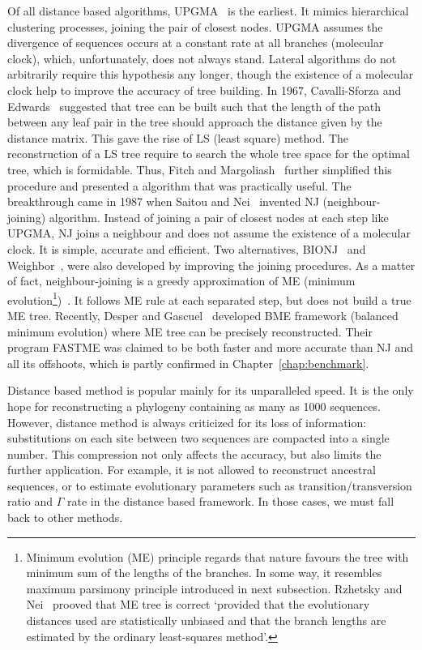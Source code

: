 Of all distance based algorithms, UPGMA~\cite{sokal58} is the earliest. It
mimics hierarchical clustering processes, joining the pair of closest nodes. UPGMA assumes
the divergence of sequences occurs at a constant rate at all branches (molecular clock), which, unfortunately,
does not always stand. Lateral algorithms do not arbitrarily require this hypothesis any longer,
though the existence of a molecular clock help to improve the accuracy of tree building.
In 1967, Cavalli-Sforza and Edwards~\cite{cavalliSforza67}
suggested that tree can be built such that the length of the path between any leaf pair in the tree
should approach the distance given by the distance matrix. This gave the rise
of LS (least square) method. The reconstruction of a LS tree
require to search the whole tree space for the optimal tree, which is formidable.
Thus, Fitch and Margoliash~\cite{fitch67}
further simplified this procedure and presented a algorithm that was practically useful.
The breakthrough came in 1987 when Saitou and Nei~\cite{saitou87} invented NJ (neighbour-joining)
algorithm. Instead of joining a pair of closest nodes at each step like UPGMA, NJ joins a neighbour and
does not assume the existence of a molecular clock.
It is simple, accurate and efficient. Two alternatives, BIONJ~\cite{gascuel97} and
Weighbor~\cite{bruno00}, were also developed by improving the joining procedures.
As a matter of fact, neighbour-joining is a greedy approximation of ME (minimum
evolution\footnote{Minimum evolution (ME) principle regards that nature favours the tree with minimum
sum of the lengths of the branches. In some way, it resembles maximum parsimony principle
introduced in next subsection. Rzhetsky and Nei~\cite{rzhetsky93}
prooved that ME tree is correct `provided that the evolutionary distances used are statistically
unbiased and that the branch lengths are estimated by the ordinary least-squares method'.})~\cite{rzhetsky93}.
It follows ME rule at each separated step, but does not build a true ME tree.
Recently, Desper and Gascuel~\cite{desper04} developed
BME framework (balanced minimum evolution)
where ME tree can be precisely reconstructed.
Their program FASTME was claimed to be both faster and more accurate than NJ and
all its offshoots, which is partly confirmed in Chapter~\ref{chap:benchmark}.

Distance based method is popular mainly for its unparalleled speed. It is the only
hope for reconstructing a phylogeny containing as many as 1000 sequences. However, distance method
is always criticized for its loss of information: substitutions on
each site between two sequences are compacted into a single number. This
compression not only affects the accuracy, but also limits the further application.
For example, it is not allowed to reconstruct ancestral sequences, or
to estimate evolutionary parameters such as transition/transversion ratio and $\Gamma$ rate
in the distance based framework. In those cases, we must fall back
to other methods.

